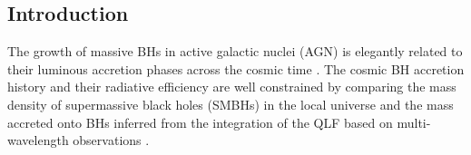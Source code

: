 \documentclass[twocolumn, twocolappendix]{aastex63}
\begin{document}
\begin{CJK*}{UTF8}{gbsn}



\vspace{5mm}
\section{Introduction} \label{sec:intro}
The growth of massive BHs in active galactic nuclei (AGN) is elegantly related to their luminous accretion phases
across the cosmic time \citep{1982MNRAS.200..115S}.
The cosmic BH accretion history and their radiative efficiency are well constrained by 
comparing the mass density of supermassive black holes (SMBHs) in the local universe and the mass accreted onto BHs inferred from
the integration of the QLF based on multi-wavelength observations
\citep[e.g.][]{1971ApJ...170..223C,1992MNRAS.259..725S,2002MNRAS.335..965Y,2004MNRAS.351..169M,2008MNRAS.388.1011M,2004MNRAS.354.1020S,
2009ApJ...690...20S,2014MNRAS.439.2736D,2014ApJ...786..104U,2017A&A...600A..64T,2022arXiv220607357S}.



\end{CJK*}
\end{document}
